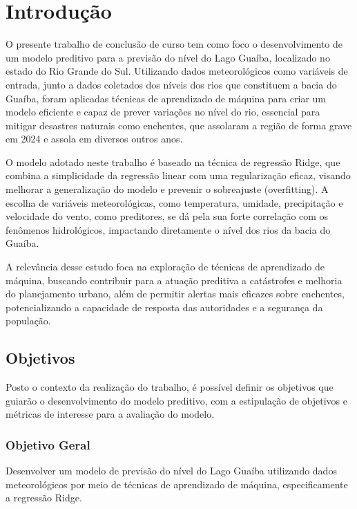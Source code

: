\chapter{Introdução}
O presente trabalho de conclusão de curso tem como foco o desenvolvimento de um modelo preditivo para a previsão do nível do Lago Guaíba, localizado no estado do Rio Grande do Sul. Utilizando dados meteorológicos como variáveis de entrada, junto a dados coletados dos níveis dos rios que constituem a bacia do Guaíba, foram aplicadas técnicas de aprendizado de máquina para criar um modelo eficiente e capaz de prever variações no nível do rio, essencial para mitigar desastres naturais como enchentes, que assolaram a região de forma grave em 2024 e assola em diversos outros anos.

O modelo adotado neste trabalho é baseado na técnica de regressão Ridge, que combina a simplicidade da regressão linear com uma regularização eficaz, visando melhorar a generalização do modelo e prevenir o sobreajuste (overfitting). A escolha de variáveis meteorológicas, como temperatura, umidade, precipitação e velocidade do vento, como preditores, se dá pela sua forte correlação com os fenômenos hidrológicos, impactando diretamente o nível dos rios da bacia do Guaíba.

A relevância desse estudo foca na exploração de técnicas de aprendizado de máquina, buscando contribuir para a atuação preditiva a catástrofes e melhoria do planejamento urbano, além de permitir alertas mais eficazes sobre enchentes, potencializando a capacidade de resposta das autoridades e a segurança da população.

\section{Objetivos}

Posto o contexto da realização do trabalho, é possível definir os objetivos que guiarão o desenvolvimento do modelo preditivo, com a estipulação de objetivos e métricas de interesse para a avaliação do modelo.

\subsection{Objetivo Geral}

Desenvolver um modelo de previsão do nível do Lago Guaíba utilizando dados meteorológicos por meio de técnicas de aprendizado de máquina, especificamente a regressão Ridge.

